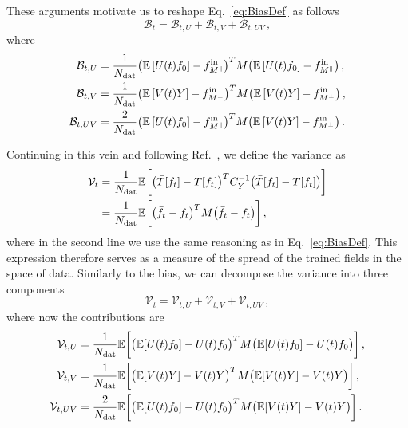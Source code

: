 These arguments motivate us to reshape Eq.~\eqref{eq:BiasDef} as follows
\begin{equation}
  \mathcal{B}_t = \mathcal{B}_{t,U} + \mathcal{B}_{t,V} + \mathcal{B}_{t,UV} \,,
  \label{eq:BiasDecomposition}
\end{equation}
where
\begin{align}
  \mathcal{B}_{t,U} &= \frac{1}{N_{\rm dat}} 
  \bigl( \mathbb{E}\left[U(t)f_0\right] - f^{\rm in}_{M^{\parallel}} \bigr)^T
  M 
  \bigl( \mathbb{E}\left[U(t)f_0\right] - f^{\rm in}_{M^{\parallel}} \bigr) \,, \\
  \mathcal{B}_{t,V} &= \frac{1}{N_{\rm dat}} 
  \bigl( \mathbb{E}\left[V(t)Y\right] - f^{\rm in}_{M^{\perp}} \bigr)^T
  M
  \bigl( \mathbb{E}\left[V(t)Y\right] - f^{\rm in}_{M^{\perp}} \bigr) \,, \\
  \mathcal{B}_{t,UV} &= \frac{2}{N_{\rm dat}} 
  \bigl( \mathbb{E}\left[U(t)f_0\right] - f^{\rm in}_{M^{\parallel}} \bigr)^T
  M
  \bigl( \mathbb{E}\left[V(t)Y\right] - f^{\rm in}_{M^{\perp}} \bigr) \,.
\end{align}

Continuing in this vein and following Ref.~\cite{NNPDF:2021njg}, we define the
variance as
\begin{align}
  \mathcal{V}_t 
  &= \frac{1}{N_{\rm dat}} \mathbb{E} \biggl[\bigl( \bar{T}[f_t] - T[f_t] \bigr)^T C_Y^{-1}\bigl( \bar{T}[f_t] - T[f_t] \bigr)\biggr] \\
  &= \frac{1}{N_{\rm dat}} \mathbb{E} \biggl[\bigl( \bar{f_t} - f_t \bigr)^T M \bigl( \bar{f_t} - f_t \bigr)\biggr] \,,
\end{align}
where in the second line we use the same reasoning as in Eq.~\eqref{eq:BiasDef}.
This expression therefore serves as a measure of the spread of the trained
fields in the space of data. Similarly to the bias, we can decompose the
variance into three components
\begin{equation}
  \mathcal{V}_t = \mathcal{V}_{t,U} + \mathcal{V}_{t,V} + \mathcal{V}_{t,UV} \,,
  \label{eq:VarianceDecomposition}
\end{equation}
where now the contributions are
\begin{align}
  \mathcal{V}_{t,U}
    &= \frac{1}{N_{\mathrm{dat}}} \mathbb{E} \biggl[
      \bigl( \mathbb{E} [U(t)f_0] - U(t)f_0 \bigr)^T M \bigl( \mathbb{E} [U(t)f_0] - U(t)f_0 \bigr)
    \biggr]\,, \\
  \mathcal{V}_{t,V}
    &= \frac{1}{N_{\mathrm{dat}}} \mathbb{E} \biggl[
      \bigl( \mathbb{E} [V(t)Y] - V(t)Y \bigr)^T M \bigl( \mathbb{E} [V(t)Y] - V(t)Y \bigr)
  \biggr]\,, \\
  \mathcal{V}_{t,UV}
    &= \frac{2}{N_{\mathrm{dat}}} \mathbb{E} \biggl[
      \bigl( \mathbb{E} [U(t)f_0] - U(t)f_0 \bigr)^T M \bigl( \mathbb{E} [V(t)Y] - V(t)Y \bigr)
  \biggr]\,.
\end{align}

